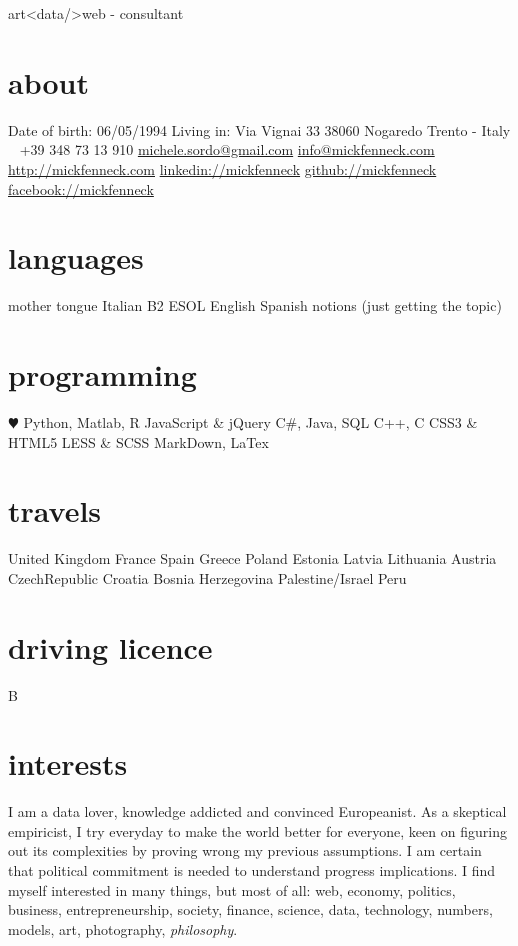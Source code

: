 \documentclass[]{friggeri-cv}
\begin{document}
       {art<data/>web - consultant}


\begin{aside}
  \section{about}
    Date of birth:
    06/05/1994
    Living in:
    Via Vignai 33
    38060 Nogaredo
    Trento - Italy
    ~
    +39 348 73 13 910
    \href{mailto:michele.sordo@gmail.com}{michele.sordo@gmail.com}
    \href{mailto:info@mickfenneck.com}{info@mickfenneck.com}
    \href{http://mickfenneck.com}{http://mickfenneck.com}
    \href{http://linkedin.com/in/mickfenneck}{linkedin://mickfenneck}
    \href{http://github.com/mickfenneck}{github://mickfenneck}
    \href{http://facebook.com/mickfenneck}{facebook://mickfenneck}
  \section{languages}
    mother tongue Italian
    B2 ESOL English
    Spanish notions
    (just getting the topic)
  \section{programming}
    {\color{red} $\varheartsuit$} Python,
    Matlab, R
    JavaScript \& jQuery
    C\#, Java, SQL
    C++, C
    CSS3 \& HTML5
    LESS \& SCSS
    MarkDown, LaTex
\section{travels}
    United Kingdom
    France
    Spain
    Greece
    Poland
    Estonia
    Latvia
    Lithuania
    Austria
    CzechRepublic
    Croatia
    Bosnia Herzegovina
    Palestine/Israel
    Peru
\section{driving licence}
    B
\end{aside}






\section{interests}
I am a data lover, knowledge addicted and convinced Europeanist. As a skeptical empiricist, I try everyday to make the world better for everyone, keen on figuring out its complexities by proving wrong my previous assumptions. I am certain that political commitment is needed to understand progress implications. I find myself interested in many things, but most of all: web, economy, politics, business, entrepreneurship, society, finance, science, data, technology, numbers, models, art, photography, \emph{philosophy}.
\end{document}
